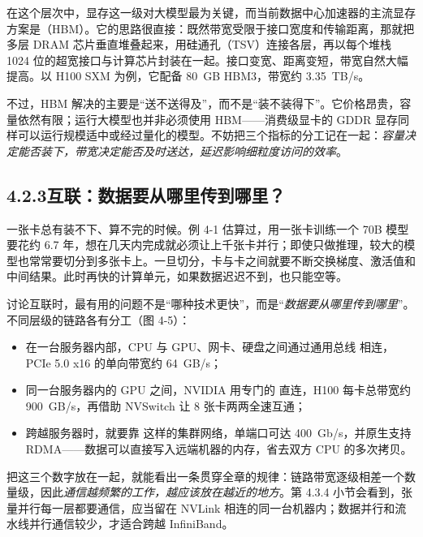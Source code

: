 在这个层次中，显存这一级对大模型最为关键，而当前数据中心加速器的主流显存方案是（HBM）。它的思路很直接：既然带宽受限于接口宽度和传输距离，那就把多层 DRAM 芯片垂直堆叠起来，用硅通孔（TSV）连接各层，再以每个堆栈 1024 位的超宽接口与计算芯片封装在一起。接口变宽、距离变短，带宽自然大幅提高。以 H100 SXM 为例，它配备 \SI{80}{GB} HBM3，带宽约 \SI{3.35}{TB/s}。

不过，HBM 解决的主要是“送不送得及”，而不是“装不装得下”。它价格昂贵，容量依然有限；运行大模型也并非必须使用 HBM——消费级显卡的 GDDR 显存同样可以运行规模适中或经过量化的模型。不妨把三个指标的分工记在一起：\emph{容量决定能否装下，带宽决定能否及时送达，延迟影响细粒度访问的效率}。

\subsection*{4.2.3\quad 互联：数据要从哪里传到哪里？}

一张卡总有装不下、算不完的时候。例 4-1 估算过，用一张卡训练一个 70B 模型要花约 6.7 年，想在几天内完成就必须让上千张卡并行；即使只做推理，较大的模型也常常要切分到多张卡上。一旦切分，卡与卡之间就要不断交换梯度、激活值和中间结果。此时再快的计算单元，如果数据迟迟不到，也只能空等。

讨论互联时，最有用的问题不是“哪种技术更快”，而是“\emph{数据要从哪里传到哪里}”。不同层级的链路各有分工（图 4-5）：
\begin{itemize}
  \item 在一台服务器内部，CPU 与 GPU、网卡、硬盘之间通过通用总线  相连，PCIe 5.0 x16 的单向带宽约 \SI{64}{GB/s}；
  \item 同一台服务器内的 GPU 之间，NVIDIA 用专门的  直连，H100 每卡总带宽约 \SI{900}{GB/s}，再借助 NVSwitch 让 8 张卡两两全速互通；
  \item 跨越服务器时，就要靠  这样的集群网络，单端口可达 \SI{400}{Gb/s}，并原生支持 RDMA——数据可以直接写入远端机器的内存，省去双方 CPU 的多次拷贝。
\end{itemize}

把这三个数字放在一起，就能看出一条贯穿全章的规律：链路带宽逐级相差一个数量级，因此\emph{通信越频繁的工作，越应该放在越近的地方}。第 4.3.4 小节会看到，张量并行每一层都要通信，应当留在 NVLink 相连的同一台机器内；数据并行和流水线并行通信较少，才适合跨越 InfiniBand。

